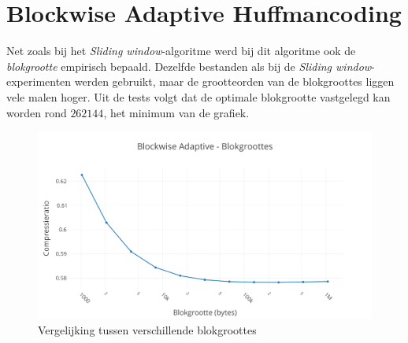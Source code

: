 \section{Blockwise Adaptive Huffmancoding}

Net zoals bij het \emph{Sliding window}-algoritme werd bij dit algoritme ook de \emph{blokgrootte} empirisch bepaald. Dezelfde bestanden als bij de \emph{Sliding window}-experimenten werden gebruikt, maar de grootteorden van de blokgroottes liggen vele malen hoger. Uit de tests volgt dat de optimale blokgrootte vastgelegd kan worden rond $262144$, het minimum van de grafiek.

\begin{figure}[h]
	\centering
	\includegraphics[width=0.9\linewidth]{resources/blockwise-size.png}
	\caption{Vergelijking tussen verschillende blokgroottes}
\end{figure}